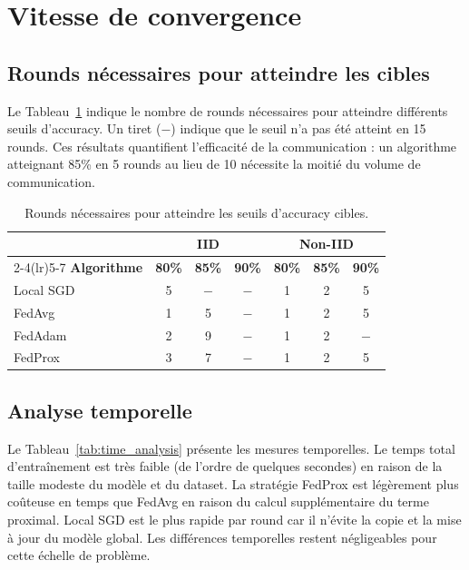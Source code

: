 \documentclass[12pt,a4paper]{report}
\begin{document}
\section{Vitesse de convergence}

\subsection{Rounds n\'{e}cessaires pour atteindre les cibles}

Le Tableau~\ref{tab:rounds_target} indique le nombre de rounds n\'{e}cessaires pour atteindre diff\'{e}rents seuils d'accuracy. Un tiret ($-$) indique que le seuil n'a pas \'{e}t\'{e} atteint en 15 rounds. Ces r\'{e}sultats quantifient l'efficacit\'{e} de la communication : un algorithme atteignant 85\% en 5 rounds au lieu de 10 n\'{e}cessite la moiti\'{e} du volume de communication.

\begin{table}[H]
\centering
\caption{Rounds n\'{e}cessaires pour atteindre les seuils d'accuracy cibles.}
\label{tab:rounds_target}
\begin{tabular}{lcccccc}
\toprule
& \multicolumn{3}{c}{\textbf{IID}} & \multicolumn{3}{c}{\textbf{Non-IID}} \\
\cmidrule(lr){2-4}\cmidrule(lr){5-7}
\textbf{Algorithme} & \textbf{80\%} & \textbf{85\%} & \textbf{90\%} & \textbf{80\%} & \textbf{85\%} & \textbf{90\%} \\
\midrule
Local SGD & 5 & $-$ & $-$ & 1 & 2 & 5 \\
FedAvg    & 1 & 5 & $-$ & 1 & 2 & 5 \\
FedAdam   & 2 & 9 & $-$ & 1 & 2 & $-$ \\
FedProx   & 3 & 7 & $-$ & 1 & 2 & 5 \\
\bottomrule
\end{tabular}
\end{table}

\subsection{Analyse temporelle}

Le Tableau~\ref{tab:time_analysis} pr\'{e}sente les mesures temporelles. Le temps total d'entra\^{i}nement est tr\`{e}s faible (de l'ordre de quelques secondes) en raison de la taille modeste du mod\`{e}le et du dataset. La strat\'{e}gie FedProx est l\'{e}g\`{e}rement plus co\^{u}teuse en temps que FedAvg en raison du calcul suppl\'{e}mentaire du terme proximal. Local SGD est le plus rapide par round car il n'\'{e}vite la copie et la mise \`{a} jour du mod\`{e}le global. Les diff\'{e}rences temporelles restent n\'{e}gligeables pour cette \'{e}chelle de probl\`{e}me.
\end{document}
